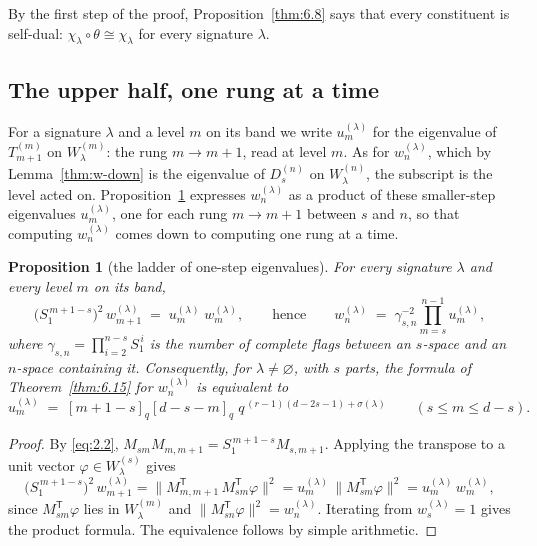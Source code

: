 \documentclass[11pt]{article}
\numberwithin{equation}{section}
\theoremstyle{plain}
\newtheorem{proposition}[theorem]{Proposition}
\theoremstyle{definition}
\begin{document}
By the first step of the proof, Proposition~\ref{thm:6.8} says that every constituent is
self-dual: $\chi_\lambda\circ\theta\cong\chi_\lambda$ for every signature $\lambda$.

\subsection{The upper half, one rung at a time}\label{sec:6.3}

For a signature $\lambda$ and a level $m$ on its band we write $u^{(\lambda)}_m$ for the
eigenvalue of $T^{(m)}_{m+1}$ on $W^{(m)}_\lambda$: the rung $m\to m+1$, read at level $m$. As
for $w^{(\lambda)}_n$, which by Lemma~\ref{thm:w-down} is the eigenvalue of $D^{(n)}_s$ on
$W^{(n)}_\lambda$, the subscript is the level acted on. Proposition~\ref{thm:6.9} expresses $w^{(\lambda)}_n$ as a product of these
smaller-step eigenvalues $u^{(\lambda)}_m$, one for each rung $m\to m+1$ between $s$ and
$n$, so that computing $w^{(\lambda)}_n$ comes down to computing one rung at a time.

\begin{proposition}[the ladder of one-step eigenvalues]\label{thm:6.9}
For every signature $\lambda$ and every level $m$ on its band,
\[
\bigl(S^{\,m+1-s}_{1}\bigr)^{2}\,w^{(\lambda)}_{m+1}
\;=\;u^{(\lambda)}_m\;w^{(\lambda)}_{m},
\qquad\text{hence}\qquad
w^{(\lambda)}_n\;=\;\gamma_{s,n}^{-2}\prod_{m=s}^{n-1}u^{(\lambda)}_m,
\]
where $\gamma_{s,n}=\prod_{i=2}^{n-s}S^{\,i}_{1}$ is the number of complete flags
between an $s$-space and an $n$-space containing it. Consequently, for $\lambda\ne\varnothing$, with $s$
parts, the formula of Theorem~\ref{thm:6.15} for $w^{(\lambda)}_n$ is equivalent to
\begin{equation}\label{eq:6.3}
u^{(\lambda)}_m\;=\;[m+1-s]_q[d-s-m]_q\;
q^{\,(r-1)(d-2s-1)+\sigma(\lambda)}\qquad(s\le m\le d-s).
\end{equation}
\end{proposition}

\begin{proof}
By \eqref{eq:2.2}, $M_{sm}M_{m,m+1}=S^{\,m+1-s}_1M_{s,m+1}$. Applying the
transpose to a unit vector $\varphi\in W^{(s)}_\lambda$ gives
\[
\bigl(S^{\,m+1-s}_1\bigr)^2\,w^{(\lambda)}_{m+1}
=\bigl\lVert M_{m,m+1}^{\mathsf T}\,M_{sm}^{\mathsf T}\varphi\bigr\rVert^2
=u^{(\lambda)}_m\,\bigl\lVert M_{sm}^{\mathsf T}\varphi\bigr\rVert^2
=u^{(\lambda)}_m\,w^{(\lambda)}_{m},
\]
since $M_{sm}^{\mathsf T}\varphi$ lies in $W^{(m)}_\lambda$ and
$\lVert M_{sn}^{\mathsf T}\varphi\rVert^2=w^{(\lambda)}_n$. Iterating from
$w^{(\lambda)}_{s}=1$ gives the product formula. The equivalence follows by simple arithmetic.
\end{proof}
\end{document}
